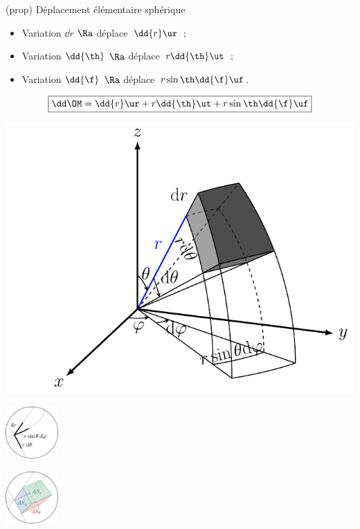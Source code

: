 \documentclass[../../main/main.tex]{subfiles}
\begin{document}
\begin{tcb*}[sidebyside, righthand ratio=.5](prop)
	{Déplacement élémentaire sphérique}
	\begin{itemize}
		\item Variation $\dd{r}$ $\Ra$ déplace\mnt\ $\dd{r}\ur$~;
		\item Variation $\dd{\th}$ $\Ra$ déplace\mnt\ $r\dd{\th}\ut$~;
		\item Variation $\dd{\f}$ $\Ra$ déplace\mnt\ $r\sin\th\dd{\f}\uf$.
	\end{itemize}
	\[\boxed{\dd\OM = \dd{r}\ur + r\dd{\th}\ut + r\sin\th\dd{\f}\uf}\]
	\tcblower
	\noindent
	\begin{minipage}{.59\linewidth}
		\begin{center}
			\includegraphics[width=\linewidth]{sphe_vol}
			\captionsetup{justification=centering}
		\end{center}
	\end{minipage}
	\begin{minipage}{.39\linewidth}
		\begin{center}
			\includegraphics[height=2cm]{zoom_sph_lgn}
		\end{center}
		\begin{center}
			\includegraphics[height=2cm]{zoom_sph_sfc}
			\captionsetup{justification=centering}
		\end{center}
	\end{minipage}
\end{tcb*}
\end{document}
